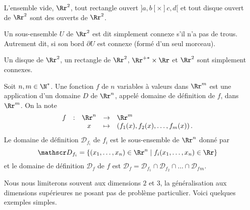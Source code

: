 \documentclass[class=report,crop=false]{standalone}
\begin{document}
\vskip4mm

L'ensemble vide, $\Rr^2$, tout rectangle ouvert $]a,b[\times ]c,d[$ et tout disque ouvert de $\Rr^2$ sont des ouverts de $\Rr^2$.

\vskip6mm

\begin{definition}
Un sous-ensemble $U$ de $\Rr^2$ est dit simplement connexe s'il n'a pas de trous. Autrement dit, si son bord $\partial U$ est connexe (formé d'un seul morceau).
\end{definition}

\vskip4mm

Un disque de $\Rr^2$, un rectangle de $\Rr^2$, $\Rr^{+*}\times \Rr$ et $\Rr^2$ sont simplement connexes.

\vskip6mm

\begin{definition} Soit $n,m\in \N^*$. Une fonction $f$ de $n$ variables à valeurs dans $\Rr^m$ est une application d'un domaine $D$ de $\Rr^n$, appelé domaine de définition de $f$, dans $\Rr^m$. On la note 
$$\begin{array}{ccccl}f&:&\Rr^n&\to &\Rr^m\\ &&x&\mapsto &\left(f_1(x),f_2(x),\dots ,f_m(x)\right).\end{array}$$
Le domaine de définition ${\mathscr D}_{f_i}$ de $f_i$ est le sous-ensemble de $\Rr^n$ donné par
$${\mathscr D}_{f_i}=\{(x_1,\dots ,x_n)\in \Rr^n\mid f_i(x_1,\dots ,x_n)\in \Rr\}$$
et le domaine de définition ${\mathscr D}_f$ de $f$ est ${\mathscr D}_f={\mathscr D}_{f_1}\cap {\mathscr D}_{f_2}\cap \dots \cap {\mathscr D}_f{_m}$.
\end{definition}

\vskip4mm

\noindent Nous nous limiterons souvent aux dimensions $2$ et $3$, la généralisation aux dimensions supérieures ne posant pas de problème particulier. Voici quelques exemples simples.

\vskip4mm
\end{document}
